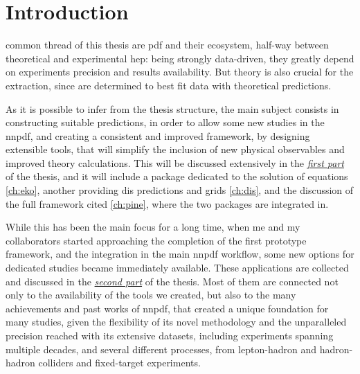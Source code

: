 

\chapter*{Introduction}
%
	{}

 common thread of this thesis are \acrfull{pdf} and their
ecosystem, half-way between theoretical and experimental \acrfull{hep}: being
strongly data-driven, they greatly depend on experiments precision and results
availability.
But theory is also crucial for the extraction, since  are
determined to best fit data with theoretical predictions.

As it is possible to infer from the thesis structure, the main subject consists
in constructing suitable predictions, in order to allow some new studies
in the \acrlong{nnpdf}, and creating a consistent and improved framework, by
designing extensible tools, that will simplify the inclusion of new physical
observables and improved theory calculations.
This will be discussed extensively in the \hyperref[part:th]{\textit{first
part}} of the thesis, and it will include a package dedicated to the solution
of \dglap equations \cref{ch:eko}, another providing \acrfull{dis} predictions
and grids \cref{ch:dis}, and the discussion of the full framework cited
\cref{ch:pine}, where the two packages are integrated in.

While this has been the main focus for a long time, when me and my
collaborators started approaching the completion of the first prototype
framework, and the integration in the main \acrshort{nnpdf} workflow, some new
options for dedicated studies became immediately available.
These applications are collected and discussed in the
\hyperref[part:app]{\textit{second part}} of the thesis.
Most of them are connected not only to the availability of the tools we
created, but also to the many achievements and past works of \acrshort{nnpdf},
that created a unique foundation for many studies, given the flexibility of its
novel methodology and the unparalleled precision reached with its extensive
datasets, including experiments spanning multiple decades, and several
different processes, from lepton-hadron and hadron-hadron colliders and
fixed-target experiments.

